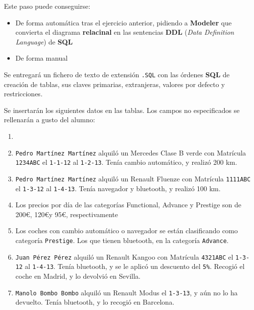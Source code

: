 \begin{homeworkProblem}
  Este paso puede conseguirse:
  \begin{itemize}
  \item De forma automática tras el ejercicio anterior, pidiendo a \textbf{Modeler} que convierta el diagrama \textbf{relacinal} en las sentencias \textbf{DDL} (\textit{Data Definition Language}) de \textbf{SQL}
  \item De forma manual
  \end{itemize}

  Se entregará un fichero de texto de extensión \texttt{.SQL} con las órdenes \textbf{SQL} de creación de tablas, sus claves primarias, extranjeras, valores por defecto y restricciones.

\end{homeworkProblem}



\begin{homeworkProblem}
Se insertarán los siguientes datos en las tablas. Los campos no especificados se
rellenarán a gusto del alumno:

\begin{enumerate}
\item \item  \texttt{Pedro Martínez Martínez} alquiló un Mercedes Clase B verde con
Matrícula \texttt{1234ABC} el \texttt{1-1-12} al \texttt{1-2-13}. Tenía cambio automático, y
realizó 200 km.
\item  \texttt{Pedro Martínez Martínez} alquiló un Renault Fluenze con Matrícula
\texttt{1111ABC} el \texttt{1-3-12} al \texttt{1-4-13}. Tenía navegador y bluetooth, y realizó
100 km.
\item  Los precios por día de las categorías Functional, Advance y Prestige
son de 200\euro, 120\euro y 95\euro, respectivamente

\item  Los coches con cambio automático o navegador se están clasificando
como categoría \texttt{Prestige}. Los que tienen bluetooth, en la categoría
\texttt{Advance}.
\item  \texttt{Juan Pérez Pérez} alquiló un Renault Kangoo con Matrícula \texttt{4321ABC} el
\texttt{1-3-12} al \texttt{1-4-13}. Tenía bluetooth, y se le aplicó un descuento del \texttt{5\%}.
Recogió el coche en Madrid, y lo devolvió en Sevilla.
\item  \texttt{Manolo Bombo Bombo} alquiló un Renault Modus el \texttt{1-3-13}, y aún no lo
  ha devuelto. Tenía bluetooth, y lo recogió en Barcelona.
\end{enumerate}
\end{homeworkProblem}


